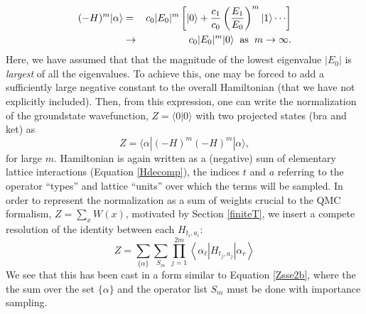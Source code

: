 \documentclass[vecphys]{svmult}
\begin{document}
\begin{eqnarray}
(-H)^m |\alpha \rangle &=& c_0|E_0|^m \left[{  |0 \rangle + \frac{c_1}{c_0} \left({ \frac{E_1}{E_0} }\right)^m|1 \rangle \cdots  }\right] \\
&\rightarrow& c_0|E_0|^m |0 \rangle \hspace{2mm} {\rm as} \hspace{2mm} m \rightarrow \infty. \nonumber
\end{eqnarray}
Here, we have assumed that that the magnitude of the lowest eigenvalue $|E_0|$ is {\it largest} of all the eigenvalues.  To achieve this, one may be forced to add a sufficiently large negative constant to the overall Hamiltonian (that we have not explicitly included).
Then, from this expression, one can write the normalization of the groundstate wavefunction, $Z=\langle 0 | 0 \rangle$ with two projected states (bra and ket) as
\begin{equation}
Z = \langle \alpha | (-H)^m (-H)^m | \alpha \rangle, \label{normZ2}
\end{equation}
for large $m$.  
Hamiltonian is again written as a (negative) sum of elementary lattice interactions (Equation \ref{Hdecomp}), the indices $t$ and $a$ referring to the operator ``types'' and lattice ``units'' over which the terms will be sampled.  
In order to represent the normalization as a sum of weights crucial to the QMC formalism, $Z = \sum_x W(x)$, motivated by Section \ref{finiteT},
we insert a compete resolution of the identity between each $H_{t_i,a_i}$:
\begin{equation}
Z=\sum_{ \{ \alpha\} } \sum_{S_m} 
\prod_{j=1}^{2m}   \left\langle{\alpha_{\ell}  \left| H_{t_j,a_j}\right| \alpha_r  }\right\rangle
 \label{Zproj2b}
\end{equation}
We see that this has been cast in a form similar to Equation \ref{Zsse2b}, where the  the sum over the set $\{ \alpha \}$ and the operator list $S_m$ must be done with importance sampling. 
\end{document}
